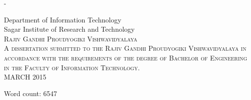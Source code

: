\begin{titlingpage}
\begin{SingleSpace}
\begin{adjustwidth*}{\unitlength}{-\unitlength}
\begin{center}
\vspace{6mm}
{\large Department of Information Technology\\
\large Sagar Institute of Research and Technology\\
\vspace{10mm}
\textsc{Rajiv Gandhi Proudyogiki Vishwavidyalaya}}\\
\vspace{11mm}
\textsc{
A dissertation submitted to the Rajiv Gandhi Proudyogiki Vishwavidyalaya in accordance with the requirements of the degree of \textsc{Bachelor of Engineering} in the Faculty of Information Technology.}
\\
\vspace{9mm}
{\large\textsc{MARCH 2015}}
\vspace{12mm}
\end{center}
\begin{flushright}
{\small Word count: 6547}
\end{flushright}
\end{adjustwidth*}
\end{SingleSpace}
\end{titlingpage}